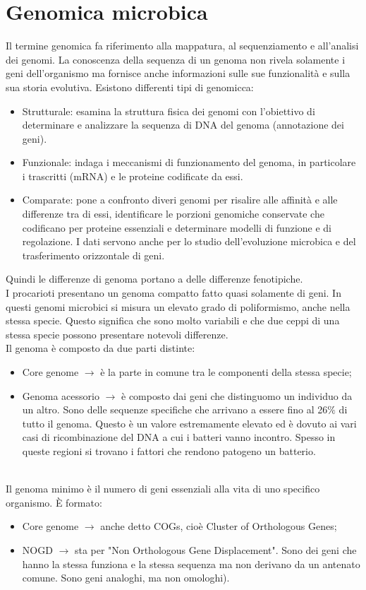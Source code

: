\chapter{Genomica microbica}
Il termine genomica fa riferimento alla mappatura, al sequenziamento e all'analisi dei genomi. La conoscenza della sequenza di un genoma non rivela solamente i geni dell'organismo ma fornisce anche informazioni sulle sue funzionalit\`a e sulla sua storia evolutiva. Esistono differenti tipi di genomicca:
\begin{itemize}
    \item Strutturale: esamina la struttura fisica dei genomi con l'obiettivo di determinare e analizzare la sequenza di DNA del genoma (annotazione dei geni).
    \item Funzionale: indaga i meccanismi di funzionamento del genoma, in particolare i trascritti (mRNA) e le proteine codificate da essi.
    \item Comparate: pone a confronto diveri genomi per risalire alle affinit\`a e alle differenze tra di essi, identificare le porzioni genomiche conservate che codificano per proteine essenziali e determinare modelli di funzione e di regolazione. I dati servono anche per lo studio dell'evoluzione microbica e del trasferimento orizzontale di geni.
\end{itemize}
Quindi le differenze di genoma portano a delle differenze fenotipiche. 
\\I procarioti presentano un genoma compatto fatto quasi solamente di geni. In questi genomi microbici si misura un elevato grado di poliformismo, anche nella stessa specie. Questo significa che sono molto variabili e che due ceppi di una stessa specie possono presentare notevoli differenze.
\\Il genoma \`e composto da due parti distinte:
\begin{itemize}
    \item Core genome $\xrightarrow{}$ \`e la parte in comune tra le componenti della stessa specie;
    \item Genoma acessorio $\xrightarrow{}$ \`e composto dai geni che distinguomo un individuo da un altro. Sono delle sequenze specifiche che arrivano a essere fino al 26$\%$ di tutto il genoma. Questo \`e un valore estremamente elevato ed \`e dovuto ai vari casi di ricombinazione del DNA a cui i batteri vanno incontro. Spesso in queste regioni si trovano i fattori che rendono patogeno un batterio.
\end{itemize}
\\Il genoma minimo \`e il numero di geni essenziali alla vita di uno specifico organismo. \`E formato:
\begin{itemize}
    \item Core genome $\xrightarrow{}$ anche detto COGs, cio\`e Cluster of Orthologous Genes;
    \item NOGD $\xrightarrow{}$ sta per "Non Orthologous Gene Displacement". Sono dei geni che hanno la stessa funziona e la stessa sequenza ma non derivano da un antenato comune. Sono geni analoghi, ma non omologhi).
\end{itemize}
